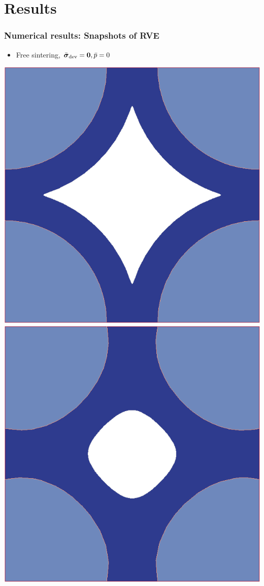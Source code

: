 \documentclass[11pt]{beamer} %
\begin{document}
\section{Results}
\begin{frame}
 \frametitle{Numerical results: Snapshots of RVE}
 \begin{itemize}
  \item Free sintering, $\bar{\boldsymbol{\sigma}}_{\mathrm{dev}} = \boldsymbol{0}, \bar{p} = 0$
 \end{itemize}
 \begin{center}
  \includegraphics[scale=0.10]{figures/evolve_free_a}\quad
  \includegraphics[scale=0.10]{figures/evolve_free_b}\quad

\end{center}
\end{frame}
\end{document}
